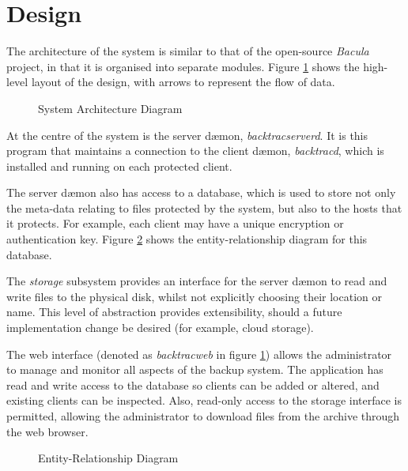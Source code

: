\section{Design}

The architecture of the system is similar to that of the open-source
\emph{Bacula} project, in that it is organised into separate modules. Figure
\ref{fig:architecture} shows the high-level layout of the design, with arrows
to represent the flow of data.

\begin{figure}[h]
    \begin{center}
        
    \end{center}
    \caption{System Architecture Diagram}
    \label{fig:architecture}
\end{figure}

At the centre of the system is the server d{\ae}mon, \emph{backtracserverd}.
It is this program that maintains a connection to the client d{\ae}mon,
\emph{backtracd}, which is installed and running on each protected client.

The server d{\ae}mon also has access to a database, which is used to store not
only the meta-data relating to files protected by the system, but also to the
hosts that it protects. For example, each client may have a unique encryption
or authentication key. Figure \ref{fig:erd} shows the entity-relationship
diagram for this database.

The \emph{storage} subsystem provides an interface for the server d{\ae}mon to
read and write files to the physical disk, whilst not explicitly choosing their
location or name. This level of abstraction provides extensibility, should
a future implementation change be desired (for example, cloud storage).

The web interface (denoted as \emph{backtracweb} in figure
\ref{fig:architecture}) allows the administrator to manage and monitor all
aspects of the backup system. The application has read and write access to the
database so clients can be added or altered, and existing clients can be
inspected. Also, read-only access to the storage interface is permitted,
allowing the administrator to download files from the archive through the web
browser.

\begin{figure}[h]
    \begin{center}
        
    \end{center}
    \caption{Entity-Relationship Diagram}
    \label{fig:erd}
\end{figure}

